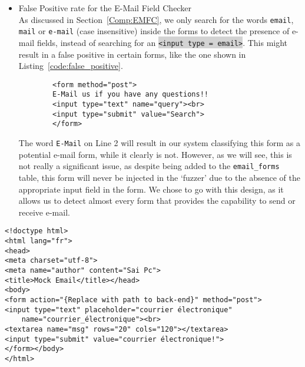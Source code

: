 \begin{itemize}
       	\item \label{issues:fpr}False Positive rate for the E-Mail Field Checker\\
       	As discussed in Section~\ref{Comp:EMFC}, we only search for the words \texttt{email}, \texttt{mail} or \texttt{e-mail} (case insensitive) inside the forms to detect the presence of e-mail fields, instead of searching for an \colorbox{lightgray}{\lstinline{<input type = email>}}. This might result in a false positive in certain forms, like the one shown in Listing~\ref{code:false_positive}.

       	\begin{lstlisting}
       	<form method="post">
       	E-Mail us if you have any questions!!
       	<input type="text" name="query"><br>
       	<input type="submit" value="Search">
       	</form>
       	\end{lstlisting}

       	The word \texttt{E-Mail} on Line 2 will result in our system classifying this form as a potential e-mail form, while it clearly is not. However, as we will see, this is not really a significant issue, as despite being added to the \texttt{email\_forms} table, this form will never be injected in the `fuzzer' due to the absence of the appropriate input field in the form. We chose to go with this design, as it allows us to detect almost every form that provides the capability to send or receive e-mail.
	\end{itemize}

\begin{lstlisting}
<!doctype html>
<html lang="fr">
<head>
<meta charset="utf-8">
<meta name="author" content="Sai Pc">
<title>Mock Email</title></head>
<body>
<form action="{Replace with path to back-end}" method="post">
<input type="text" placeholder="courrier électronique"
	name="courrier_électronique"><br>
<textarea name="msg" rows="20" cols="120"></textarea>
<input type="submit" value="courrier électronique!">
</form></body>
</html>
\end{lstlisting}